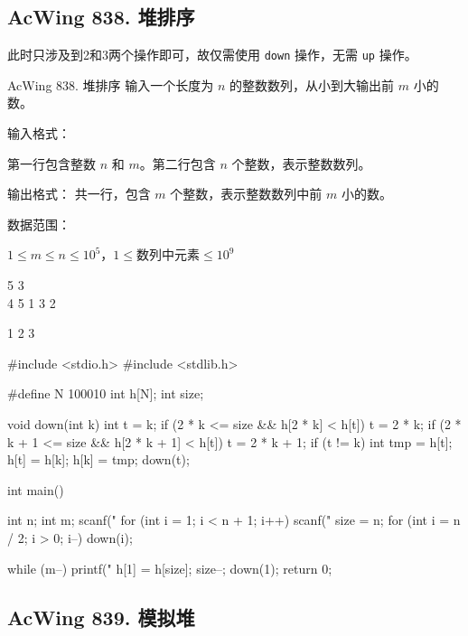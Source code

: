 \subsection{AcWing 838. 堆排序}
此时只涉及到2和3两个操作即可，故仅需使用 \lstinline{down} 操作，无需 \lstinline{up} 操作。

\begin{titledbox}{AcWing 838. 堆排序}
输入一个长度为 $n$ 的整数数列，从小到大输出前 $m$ 小的数。

输入格式：

第一行包含整数 $n$ 和 $m$。第二行包含 $n$ 个整数，表示整数数列。

输出格式：
共一行，包含 $m$ 个整数，表示整数数列中前 $m$ 小的数。

数据范围：

$1 \le m \le n \le 10^5$，$1 \le 数列中元素 \le 10^9$

\begin{inputblock}
    5 3 \\
    4 5 1 3 2
\end{inputblock}
\begin{outputblock}
    1 2 3
\end{outputblock}
        
\end{titledbox}

\begin{mycpptwocol}[堆排序]
#include <stdio.h>
#include <stdlib.h>

#define N 100010
int h[N];
int size;

void down(int k)
{
    int t = k;
    if (2 * k <= size && h[2 * k] < h[t]) {
        t = 2 * k;
    }
    if (2 * k + 1 <= size && h[2 * k + 1] < h[t]) {
        t = 2 * k + 1;
    }
    if (t != k) {
        int tmp = h[t];
        h[t] = h[k];
        h[k] = tmp;
        down(t);
    }
}

int main()
{
    int n;
    int m;
    scanf("%
    for (int i = 1; i < n + 1; i++) {
        scanf("%
    }
    size = n;
    for (int i = n / 2; i > 0; i--) {
        down(i);
    }
    
    while (m--) {
        printf("%
        h[1] = h[size];
        size--;
        down(1);
    }
    return 0;
}
\end{mycpptwocol}

\subsection{AcWing 839. 模拟堆}

